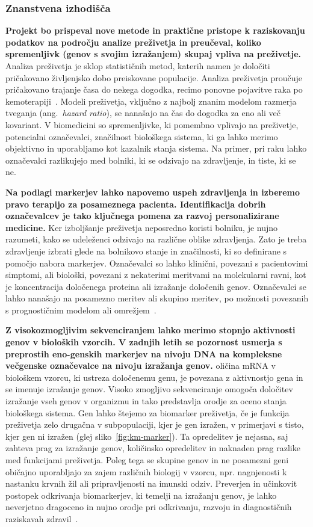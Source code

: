 \documentclass[11pt,a4paper]{article}
\renewcommand{\bold}{\textbf}
\begin{document}
\subsubsection*{Znanstvena izhodišča}

\bold{Projekt bo prispeval nove metode in praktične pristope k raziskovanju podatkov na področju analize preživetja in preučeval, koliko spremenljivk (genov s svojim izražanjem) skupaj vpliva na preživetje.} Analiza preživetja je sklop statističnih metod, katerih namen je določiti pričakovano življenjsko dobo preiskovane populacije. Analiza preživetja proučuje pričakovano trajanje časa do nekega dogodka, recimo ponovne pojavitve raka po kemoterapiji~\cite{pazdur2008endpoints}. Modeli preživetja, vključno z najbolj znanim modelom razmerja tveganja (ang.~{\em hazard ratio}), se nanašajo na čas do dogodka za eno ali več kovariant. V biomedicini so spremenljivke, ki pomembno vplivajo na preživetje, potencialni označevalci, značilnost biološkega sistema, ki ga lahko merimo objektivno in uporabljamo kot kazalnik stanja sistema. Na primer, pri raku lahko označevalci razlikujejo med bolniki, ki se odzivajo na zdravljenje, in tiste, ki se ne.

\bold{Na podlagi markerjev lahko napovemo uspeh zdravljenja in izberemo pravo terapijo za posameznega pacienta. Identifikacija dobrih označevalcev je tako ključnega pomena za razvoj personalizirane medicine.} Ker izboljšanje preživetja neposredno koristi bolniku, je nujno razumeti, kako se udeleženci odzivajo na različne oblike zdravljenja. Zato je treba zdravljenje izbrati glede na bolnikovo stanje in značilnosti, ki so definirane s pomočjo nabora markerjev. Označevalci so lahko klinični, povezani s pacientovimi simptomi, ali biološki, povezani z nekaterimi meritvami na molekularni ravni, kot je koncentracija določenega proteina ali izražanje določenih genov. Označevalci se lahko nanašajo na posamezno meritev ali skupino meritev, po možnosti povezanih s prognostičnim modelom ali omrežjem~\cite{Sonawane2019}.

\bold{Z visokozmogljivim sekvenciranjem lahko merimo stopnjo aktivnosti genov v bioloških vzorcih.
V zadnjih letih se pozornost usmerja s preprostih eno-genskih markerjev na nivoju DNA na kompleksne večgenske označevalce na nivoju izražanja genov.} oličina mRNA v biološkem vzorcu, ki ustreza določenemu genu, je povezana z aktivnostjo gena in se imenuje izražanje genov. Visoko zmogljivo sekvenciranje omogoča določitev izražanje vseh genov v organizmu in tako predstavlja orodje za oceno stanja biološkega sistema. Gen lahko štejemo za biomarker preživetja, če je funkcija preživetja zelo drugačna v subpopulaciji, kjer je gen izražen, v primerjavi s tisto, kjer gen ni izražen (glej sliko~\ref{fig:km-marker}). Ta opredelitev je nejasna, saj zahteva prag za izražanje genov, količinsko opredelitev in naknaden prag razlike med funkcijami preživetja. Poleg tega se skupine genov in ne posamezni geni običajno uporabljajo za zajem različnih biologij v vzorcu, npr. nagnjenosti k nastanku krvnih žil ali pripravljenosti na imunski odziv. Preverjen in učinkovit postopek odkrivanja biomarkerjev, ki temelji na izražanju genov, je lahko neverjetno dragoceno in nujno orodje pri odkrivanju, razvoju in diagnostičnih raziskavah zdravil~\cite{MonforteMcPhail2005}.
\end{document}
